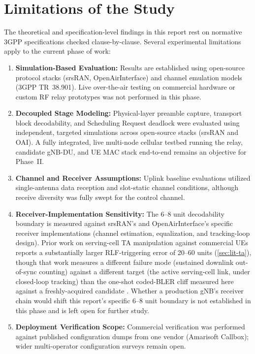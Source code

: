 \section{Limitations of the Study}
\label{sec:limits}

The theoretical and specification-level findings in this report rest on normative 3GPP specifications
checked clause-by-clause. Several experimental limitations apply to the current phase of work:
\begin{enumerate}\itemsep2pt
  \item \textbf{Simulation-Based Evaluation:} Results are established using open-source protocol stacks
        (srsRAN, OpenAirInterface) and channel emulation models (3GPP TR~38.901). Live over-the-air
        testing on commercial hardware or custom RF relay prototypes was not performed in this phase.
  \item \textbf{Decoupled Stage Modeling:} Physical-layer preamble capture, transport block decodability,
        and Scheduling Request deadlock were evaluated using independent, targeted simulations across
        open-source stacks (srsRAN and OAI). A fully integrated, live multi-node cellular testbed running
        the relay, candidate gNB-DU, and UE MAC stack end-to-end remains an objective for Phase~II.
  \item \textbf{Channel and Receiver Assumptions:} Uplink baseline evaluations utilized single-antenna
        data reception and slot-static channel conditions, although receive diversity was fully swept for
        the control channel.
  \item \textbf{Receiver-Implementation Sensitivity:} The 6--8 unit decodability boundary is measured
        against srsRAN's and OpenAirInterface's specific receiver implementations (channel estimation,
        equalization, and tracking-loop design). Prior work on serving-cell TA manipulation against
        commercial UEs reports a substantially larger RLF-triggering error of 20--60 units
        (\cref{sec:lit-ta}), though that work measures a different failure mode (sustained downlink
        out-of-sync counting) against a different target (the active serving-cell link, under closed-loop
        tracking) than the one-shot coded-BLER cliff measured here against a freshly-acquired candidate
        \TA{}. Whether a production gNB's receiver chain would shift this report's specific 6--8 unit
        boundary is not established in this phase and is left open for further study.
  \item \textbf{Deployment Verification Scope:} Commercial verification was performed against published
        configuration dumps from one vendor (Amarisoft Callbox); wider multi-operator configuration surveys
        remain open.
\end{enumerate}

